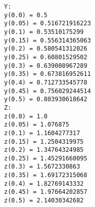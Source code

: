 {\small
\begin{verbatim}
Y:
y(0.0) = 0.5
y(0.05) = 0.516721916223
y(0.1) = 0.53510175299
y(0.15) = 0.556314365063
y(0.2) = 0.580541312026
y(0.25) = 0.60801529502
y(0.3) = 0.639008967289
y(0.35) = 0.673816952611
y(0.4) = 0.712733545778
y(0.45) = 0.756029244514
y(0.5) = 0.803930618642
Z:
z(0.0) = 1.0
z(0.05) = 1.076875
z(0.1) = 1.1604277317
z(0.15) = 1.2504319975
z(0.2) = 1.34764324985
z(0.25) = 1.45291660095
z(0.3) = 1.5672330863
z(0.35) = 1.69172315068
z(0.4) = 1.82769143332
z(0.45) = 1.97664202857
z(0.5) = 2.14030342682
\end{verbatim}
}

